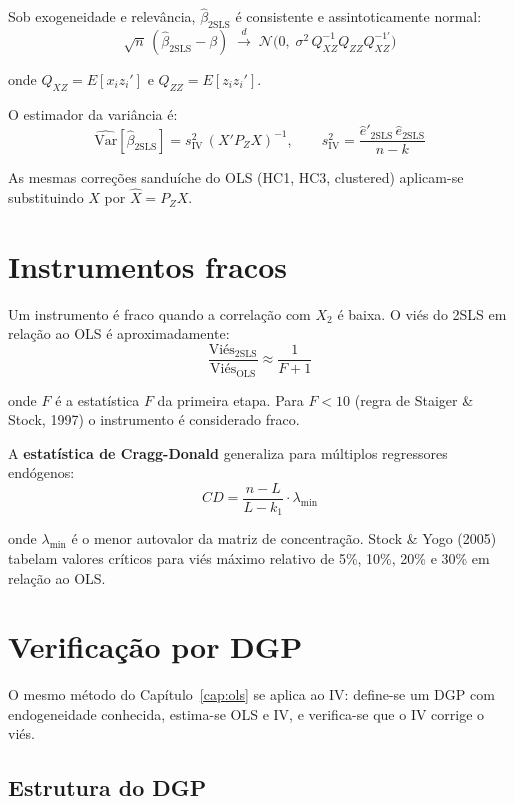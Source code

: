 Sob exogeneidade e relevância, $\hat{\beta}_{\mathrm{2SLS}}$ é consistente e
assintoticamente normal:
\[
  \sqrt{n}\,(\hat{\beta}_{\mathrm{2SLS}} - \beta)
  \;\xrightarrow{d}\;
  \mathcal{N}\!\bigl(0,\; \sigma^2 \,Q_{XZ}^{-1} Q_{ZZ} Q_{XZ}^{-1\prime}\bigr)
\]

onde $Q_{XZ} = E[x_i z_i']$ e $Q_{ZZ} = E[z_i z_i']$.

O estimador da variância é:
\[
  \widehat{\mathrm{Var}}[\hat{\beta}_{\mathrm{2SLS}}]
  = s^2_{\mathrm{IV}}\,(X'P_Z X)^{-1},
  \qquad
  s^2_{\mathrm{IV}} = \frac{\hat{e}'_{\mathrm{2SLS}}\,\hat{e}_{\mathrm{2SLS}}}{n - k}
\]

As mesmas correções sanduíche do OLS (HC1, HC3, clustered) aplicam-se
substituindo $X$ por $\hat{X} = P_Z X$.

\section{Instrumentos fracos}

Um instrumento é fraco quando a correlação com $X_2$ é baixa. O viés do
2SLS em relação ao OLS é aproximadamente:
\[
  \frac{\mathrm{Viés}_{\mathrm{2SLS}}}{\mathrm{Viés}_{\mathrm{OLS}}}
  \approx \frac{1}{F + 1}
\]

onde $F$ é a estatística $F$ da primeira etapa. Para $F < 10$ (regra de
Staiger \& Stock, 1997) o instrumento é considerado fraco.

A \textbf{estatística de Cragg-Donald} generaliza para múltiplos
regressores endógenos:
\[
  CD = \frac{n - L}{L - k_1} \cdot \lambda_{\min}
\]

onde $\lambda_{\min}$ é o menor autovalor da matriz de concentração.
Stock \& Yogo (2005) tabelam valores críticos para viés máximo relativo
de 5\%, 10\%, 20\% e 30\% em relação ao OLS.

\section{Verificação por DGP}

O mesmo método do Capítulo~\ref{cap:ols} se aplica ao IV: define-se um DGP
com endogeneidade conhecida, estima-se OLS e IV, e verifica-se que o IV
corrige o viés.

\subsection*{Estrutura do DGP}

